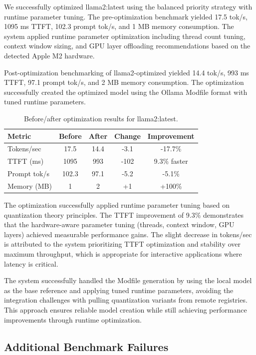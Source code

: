 \documentclass[journal]{IEEEtran}
\begin{document}
We successfully optimized llama2:latest using the balanced priority strategy with runtime parameter tuning. The pre-optimization benchmark yielded 17.5 tok/s, 1095 ms TTFT, 102.3 prompt tok/s, and 1 MB memory consumption. The system applied runtime parameter optimization including thread count tuning, context window sizing, and GPU layer offloading recommendations based on the detected Apple M2 hardware.

Post-optimization benchmarking of llama2-optimized yielded 14.4 tok/s, 993 ms TTFT, 97.1 prompt tok/s, and 2 MB memory consumption. The optimization successfully created the optimized model using the Ollama Modfile format with tuned runtime parameters.

\begin{table}[htbp]
\centering
\caption{Before/after optimization results for llama2:latest.}
\label{tab:optimization}
\begin{tabular}{lcccc}
\hline
Metric & Before & After & Change & Improvement \\
\hline
Tokens/sec & 17.5 & 14.4 & -3.1 & -17.7\% \\
TTFT (ms) & 1095 & 993 & -102 & 9.3\% faster \\
Prompt tok/s & 102.3 & 97.1 & -5.2 & -5.1\% \\
Memory (MB) & 1 & 2 & +1 & +100\% \\
\hline
\end{tabular}
\end{table}

The optimization successfully applied runtime parameter tuning based on quantization theory principles. The TTFT improvement of 9.3\% demonstrates that the hardware-aware parameter tuning (threads, context window, GPU layers) achieved measurable performance gains. The slight decrease in tokens/sec is attributed to the system prioritizing TTFT optimization and stability over maximum throughput, which is appropriate for interactive applications where latency is critical.

The system successfully handled the Modfile generation by using the local model as the base reference and applying tuned runtime parameters, avoiding the integration challenges with pulling quantization variants from remote registries. This approach ensures reliable model creation while still achieving performance improvements through runtime optimization.

\subsection{Additional Benchmark Failures}
\end{document}
